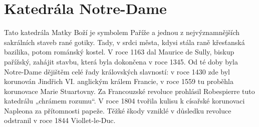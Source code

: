 \section{Katedrála Notre-Dame}
Tato katedrála Matky Boží je symbolem Paříže a jednou z nejvýznamnějších sakrálních staveb rané gotiky. Tady, v srdci města, kdysi stála raně křesťanská bazilika, potom románský kostel. V roce 1163 dal Maurice de Sully, biskup pařížský, zahájit stavbu, která byla dokončena v roce 1345. Od té doby byla Notre-Dame dějištěm celé řady královských slavností: v roce 1430 zde byl korunován Jindřich VI. anglickým králem Francie, v roce 1559 tu proběhla korunovace Marie Stuartovny. Za Francouzské revoluce prohlásil Robespierre tuto katedrálu „chrámem rozumu“. V roce 1804 tvořila kulisu k císařské korunovaci Napleona za přítomnosti papeže. Těžké škody vzniklé v důsledku revoluce odstranil v roce 1844 Viollet-le-Duc.\cite{cada}\\
